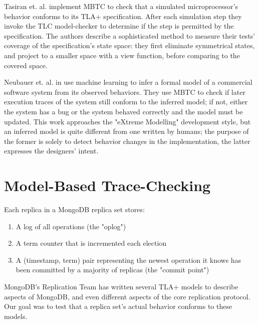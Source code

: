 \documentclass{vldb}
\begin{document}
Tasiran et. al. \cite{Tasiran03AlphaMicroprocessor} implement MBTC to check that a simulated microprocessor's behavior conforms to its TLA+ specification.
After each simulation step they invoke the TLC model-checker to determine if the step is permitted by the specification.
The authors describe a sophisticated method to measure their tests' coverage of the specification's state space: they first eliminate symmetrical states, and project to a smaller space with a view function, before comparing to the covered space.

Neubauer et. al. in \cite{Neubauer12AutomatedContinuousQualityAssurance} use machine learning to infer a formal model of a commercial software system from its observed behaviors.
They use MBTC to check if later execution traces of the system still conform to the inferred model; if not, either the system has a bug or the system behaved correctly and the model must be updated.
This work approaches the "eXtreme Modelling" development style, but an inferred model is quite different from one written by humans; the purpose of the former is solely to detect behavior changes in the implementation, the latter expresses the designers' intent.

\section{Model-Based Trace-Checking}
\label{sec:model_based_trace_checking}

Each replica in a MongoDB replica set stores:

\begin{enumerate}
\item A log of all operations (the "oplog")
\item A term counter that is incremented each election
\item A (timestamp, term) pair representing the newest operation it knows has been committed by a majority of replicas (the "commit point")
\end{enumerate}

MongoDB's Replication Team has written several TLA+ models to describe aspects of MongoDB, and even different aspects of the core replication protocol. 
Our goal was to test that a replica set's actual behavior conforms to these models.
\end{document}
